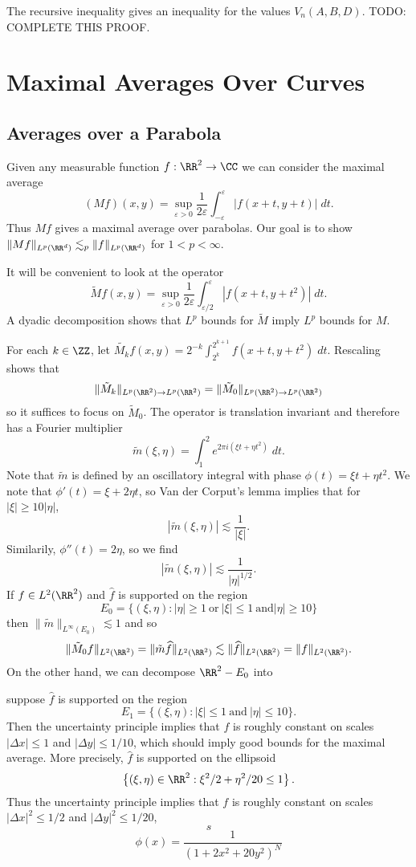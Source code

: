 The recursive inequality gives an inequality for the values $V_n(A,B,D)$. TODO: COMPLETE THIS PROOF.






\chapter{Maximal Averages Over Curves}

\section{Averages over a Parabola}

Given any measurable function $f: \RR^2 \to \CC$ we can consider the maximal average
%
\[ (Mf)(x,y) = \sup_{\varepsilon > 0} \frac{1}{2\varepsilon} \int_{-\varepsilon}^\varepsilon|f(x+t,y+t)|\; dt. \]
%
Thus $Mf$ gives a maximal average over parabolas. Our goal is to show $\| Mf \|_{L^p(\RR^d)} \lesssim_p \| f \|_{L^p(\RR^d)}$ for $1 < p < \infty$.

It will be convenient to look at the operator
%
\[ \tilde{M} f(x,y) = \sup_{\varepsilon > 0} \frac{1}{2\varepsilon} \int_{\varepsilon/2}^{\varepsilon} |f(x+t,y+t^2)|\; dt. \]
%
A dyadic decomposition shows that $L^p$ bounds for $\tilde{M}$ imply $L^p$ bounds for $M$.

For each $k \in \ZZ$, let $\tilde{M_k} f(x,y) = 2^{-k} \int_{2^k}^{2^{k+1}} f(x+t,y+t^2)\; dt$. Rescaling shows that
%
\[ \| \tilde{M}_k \|_{L^p(\RR^2) \to L^p(\RR^2)} = \| \tilde{M}_0 \|_{L^p(\RR^2) \to L^p(\RR^2)} \]
%
so it suffices to focus on $\tilde{M}_0$. The operator is translation invariant and therefore has a Fourier multiplier
%
\[ \tilde{m}(\xi,\eta) = \int_1^2 e^{2 \pi i (\xi t + \eta t^2)}\; dt. \]
%
Note that $\tilde{m}$ is defined by an oscillatory integral with phase $\phi(t) = \xi t + \eta t^2$. We note that $\phi'(t) = \xi + 2 \eta t$, so Van der Corput's lemma implies that for $|\xi| \geq 10|\eta|$,
%
\[ |\tilde{m}(\xi,\eta)| \lesssim \frac{1}{|\xi|}. \]
%
Similarily, $\phi''(t) = 2 \eta$, so we find
%
\[ |\tilde{m}(\xi,\eta)| \lesssim \frac{1}{|\eta|^{1/2}}. \]
%
If $f \in L^2(\RR^2)$ and $\widehat{f}$ is supported on the region
%
\[ E_0 = \{ (\xi,\eta) : |\eta| \geq 1\ \text{or}\ |\xi| \leq 1\ \text{and} |\eta| \geq 10 \} \]
%
then $\| \tilde{m} \|_{L^\infty(E_0)} \lesssim 1$ and so
%
\[ \| \tilde{M}_0 f \|_{L^2(\RR^2)} = \| \tilde{m} \widehat{f} \|_{L^2(\RR^2)} \lesssim \| \widehat{f} \|_{L^2(\RR^2)} = \| f \|_{L^2(\RR^2)}. \]
%
On the other hand, we can decompose $\RR^2 - E_0$ into

suppose $\widehat{f}$ is supported on the region
%
\[ E_1 = \{ (\xi,\eta) : |\xi| \leq 1\ \text{and}\ |\eta| \leq 10 \}. \]
%
Then the uncertainty principle implies that $f$ is roughly constant on scales $|\Delta x| \leq 1$ and $|\Delta y| \leq 1/10$, which should imply good bounds for the maximal average. More precisely, $\widehat{f}$ is supported on the ellipsoid
%
\[ \left\{ (\xi,\eta) \in \RR^2 : \xi^2/2 + \eta^2/20 \leq 1 \right\}. \]
%
Thus the uncertainty principle implies that $f$ is roughly constant on scales $|\Delta x|^2 \leq 1/2$ and $|\Delta y|^2 \leq 1/20$,
%
\[ s \]
%
\[ \phi(x) = \frac{1}{( 1 + 2 x^2 + 20 y^2 )^N} \]  
